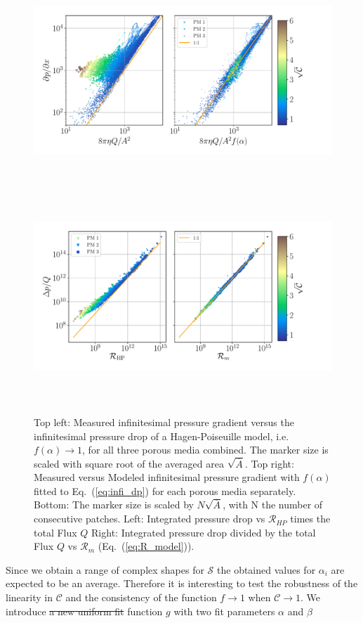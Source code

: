 \documentclass[draft]{agujournal2019}
\providecommand{\DIFadd}[1]{{\protect\color{blue}\uwave{#1}}} %
\providecommand{\DIFdel}[1]{{\protect\color{red}\sout{#1}}}                      %
\providecommand{\DIFaddbegin}{} %
\providecommand{\DIFaddend}{} %
\providecommand{\DIFdelbegin}{} %
\providecommand{\DIFdelend}{} %
\begin{document}
\begin{figure}
\includegraphics[height=8cm]{figures/infi_dpdx_combined.pdf}
\includegraphics[height=8cm]{figures/integral_R_combined.pdf}
\caption{Top left: Measured infinitesimal pressure gradient versus the infinitesimal pressure drop of a Hagen-Poiseuille model, i.e. $f(\alpha)\rightarrow 1$, for all three porous media combined. The marker size is scaled with square root of the averaged area $\sqrt{\overline{A}}$. Top right: Measured versus Modeled infinitesimal pressure gradient with $f(\alpha)$ fitted to Eq.~(\ref{eq:infi_dp}) for each porous media separately. Bottom: The marker size is scaled by $N\sqrt{\overline{A}}$, with N the number of consecutive patches. Left: Integrated pressure drop vs $\mathcal{R}_{HP}$ times the total Flux $Q$ Right: Integrated pressure drop divided by the total Flux $Q$ vs $\mathcal{R}_m$ (Eq.~(\ref{eq:R_model})). }
\label{fig:local_and_integrated}
\end{figure}


Since we obtain a range of complex shapes for $\mathcal{S}$ the obtained values for $\alpha_i$ are expected to be an average. Therefore it is interesting to test the robustness of the linearity in $\mathcal{C}$ and the consistency of the function $f \rightarrow 1$ when $\mathcal{C}\rightarrow 1$. We introduce \DIFdelbegin \DIFdel{a new uniform fit }\DIFdelend \DIFaddbegin \DIFadd{an alternative }\DIFaddend function $g$ \DIFaddbegin \DIFadd{to $f$ }\DIFaddend with two fit parameters $\alpha$ and $\beta$
\end{document}
